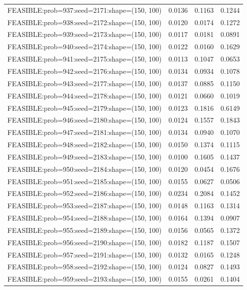 \begin{longtable}{lccc}
FEASIBLE:prob=937:seed=2171:shape=(150, 100) & 0.0136 & 0.1163 & 0.1244 \\
FEASIBLE:prob=938:seed=2172:shape=(150, 100) & 0.0120 & 0.0174 & 0.1272 \\
FEASIBLE:prob=939:seed=2173:shape=(150, 100) & 0.0117 & 0.0181 & 0.0891 \\
FEASIBLE:prob=940:seed=2174:shape=(150, 100) & 0.0122 & 0.0160 & 0.1629 \\
FEASIBLE:prob=941:seed=2175:shape=(150, 100) & 0.0113 & 0.1047 & 0.0653 \\
FEASIBLE:prob=942:seed=2176:shape=(150, 100) & 0.0134 & 0.0934 & 0.1078 \\
FEASIBLE:prob=943:seed=2177:shape=(150, 100) & 0.0137 & 0.0885 & 0.1150 \\
FEASIBLE:prob=944:seed=2178:shape=(150, 100) & 0.0121 & 0.0660 & 0.1019 \\
FEASIBLE:prob=945:seed=2179:shape=(150, 100) & 0.0123 & 0.1816 & 0.6149 \\
FEASIBLE:prob=946:seed=2180:shape=(150, 100) & 0.0124 & 0.1557 & 0.1843 \\
FEASIBLE:prob=947:seed=2181:shape=(150, 100) & 0.0134 & 0.0940 & 0.1070 \\
FEASIBLE:prob=948:seed=2182:shape=(150, 100) & 0.0150 & 0.1374 & 0.1115 \\
FEASIBLE:prob=949:seed=2183:shape=(150, 100) & 0.0100 & 0.1605 & 0.1437 \\
FEASIBLE:prob=950:seed=2184:shape=(150, 100) & 0.0120 & 0.0454 & 0.1676 \\
FEASIBLE:prob=951:seed=2185:shape=(150, 100) & 0.0155 & 0.0627 & 0.0506 \\
FEASIBLE:prob=952:seed=2186:shape=(150, 100) & 0.0234 & 0.2084 & 0.1452 \\
FEASIBLE:prob=953:seed=2187:shape=(150, 100) & 0.0148 & 0.1163 & 0.1314 \\
FEASIBLE:prob=954:seed=2188:shape=(150, 100) & 0.0164 & 0.1394 & 0.0907 \\
FEASIBLE:prob=955:seed=2189:shape=(150, 100) & 0.0156 & 0.0565 & 0.1372 \\
FEASIBLE:prob=956:seed=2190:shape=(150, 100) & 0.0182 & 0.1187 & 0.1507 \\
FEASIBLE:prob=957:seed=2191:shape=(150, 100) & 0.0132 & 0.0165 & 0.1248 \\
FEASIBLE:prob=958:seed=2192:shape=(150, 100) & 0.0124 & 0.0827 & 0.1493 \\
FEASIBLE:prob=959:seed=2193:shape=(150, 100) & 0.0155 & 0.0261 & 0.1404 \\

\end{longtable}
